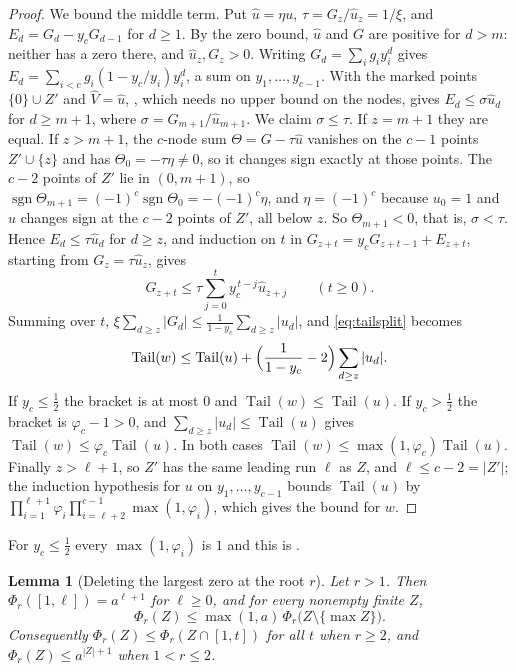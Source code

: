 \documentclass[11pt]{article}
\newtheorem{lemma}[theorem]{Lemma}
\DeclareMathOperator{\Tail}{Tail}
\DeclareMathOperator{\sgn}{sgn}
\begin{document}
\begin{proof}
We bound the middle term.  Put $\hat u=\eta u$, $\tau=G_z/\hat u_z=1/\xi$,
and $E_d=G_d-y_cG_{d-1}$ for $d\ge1$.  By the zero bound, $\hat u$ and $G$
are positive for $d>m$: neither has a zero there, and $\hat u_z,G_z>0$.
Writing $G_d=\sum_ig_iy_i^d$ gives
$E_d=\sum_{i<c}g_i(1-y_c/y_i)y_i^d$, a sum on $y_1,\ldots,y_{c-1}$.  With
the marked points $\{0\}\cup Z'$ and $\widehat V=\hat u$,
\cite[Lemma~2.3]{coefficient-mass}, which needs no upper bound on the
nodes, gives $E_d\le\sigma\hat u_d$ for $d\ge m+1$, where
$\sigma=G_{m+1}/\hat u_{m+1}$.  We claim $\sigma\le\tau$.  If $z=m+1$ they
are equal.  If $z>m+1$, the $c$-node sum $\Theta=G-\tau\hat u$ vanishes on
the $c-1$ points $Z'\cup\{z\}$ and has $\Theta_0=-\tau\eta\ne0$, so it
changes sign exactly at those points.  The $c-2$ points of $Z'$ lie in
$(0,m+1)$, so $\sgn\Theta_{m+1}=(-1)^c\sgn\Theta_0=-(-1)^c\eta$, and
$\eta=(-1)^c$ because $u_0=1$ and $u$ changes sign at the $c-2$ points of
$Z'$, all below $z$.  So $\Theta_{m+1}<0$, that is, $\sigma<\tau$.  Hence
$E_d\le\tau\hat u_d$ for $d\ge z$, and induction on $t$ in
$G_{z+t}=y_cG_{z+t-1}+E_{z+t}$, starting from $G_z=\tau\hat u_z$, gives
\[
  G_{z+t}\le\tau\sum_{j=0}^ty_c^{\,t-j}\hat u_{z+j}\qquad(t\ge0).
\]
Summing over $t$,
$\xi\sum_{d\ge z}|G_d|\le\frac1{1-y_c}\sum_{d\ge z}|u_d|$, and
\eqref{eq:tailsplit} becomes
\[
  \Tail(w)\le\Tail(u)+\Bigl(\frac1{1-y_c}-2\Bigr)\sum_{d\ge z}|u_d|.
\]
If $y_c\le\frac12$ the bracket is at most $0$ and $\Tail(w)\le\Tail(u)$.
If $y_c>\frac12$ the bracket is $\varphi_c-1>0$, and
$\sum_{d\ge z}|u_d|\le\Tail(u)$ gives $\Tail(w)\le\varphi_c\Tail(u)$.  In
both cases $\Tail(w)\le\max(1,\varphi_c)\Tail(u)$.  Finally $z>\ell+1$, so
$Z'$ has the same leading run $\ell$ as $Z$, and $\ell\le c-2=|Z'|$; the
induction hypothesis for $u$ on $y_1,\ldots,y_{c-1}$ bounds $\Tail(u)$ by
$\prod_{i=1}^{\ell+1}\varphi_i\prod_{i=\ell+2}^{c-1}\max(1,\varphi_i)$,
which gives the bound for $w$.
\end{proof}

For $y_c\le\frac12$ every $\max(1,\varphi_i)$ is $1$ and this is
\cite[Theorem~2.2]{coefficient-mass}.

\begin{lemma}[Deleting the largest zero at the root $r$]\label{lem:confdelr}
Let $r>1$.  Then $\Phi_r([1,\ell])=a^{\ell+1}$ for $\ell\ge0$, and for every
nonempty finite $Z$,
\[
  \Phi_r(Z)\le\max(1,a)\,\Phi_r\bigl(Z\setminus\{\max Z\}\bigr).
\]
Consequently $\Phi_r(Z)\le\Phi_r(Z\cap[1,t])$ for all $t$ when $r\ge2$, and
$\Phi_r(Z)\le a^{|Z|+1}$ when $1<r\le2$.
\end{lemma}
\end{document}
